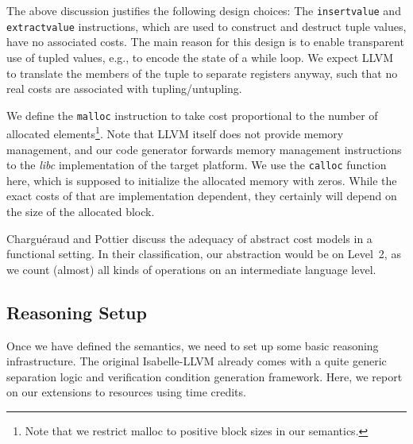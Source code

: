 \documentclass[acmsmall]{acmart}
\newcommand{\is}{\lstinline[language=isabelle]}
\begin{document}

The above discussion justifies the following design choices:
%
The \is{insertvalue} and \is{extractvalue} instructions, which are used to construct and destruct tuple values, have no associated costs.
The main reason for this design is to enable transparent use of tupled values, e.g., to encode the state
of a while loop. We expect LLVM to translate the members of the tuple to separate registers anyway, such that no real costs are associated with tupling/untupling. 
    
We define the \is{malloc} instruction to take cost proportional to the number of allocated elements\footnote{Note that we restrict malloc to positive block sizes in our semantics.}. 
Note that LLVM itself does not provide memory management, and our code generator forwards memory management instructions to
the \emph{libc} implementation of the target platform. We use the \is{calloc} function here, which is supposed to initialize the allocated memory with zeros. While the exact costs of that are implementation dependent, they certainly will depend on the size of the allocated block.

Chargu\'{e}raud and Pottier \cite[\S 2.7]{ChargueraudP19} discuss
the adequacy of abstract cost models in a functional setting. In their classification, our abstraction would be on Level~2, as we count (almost) all kinds of operations on an intermediate language level.


\subsection{Reasoning Setup}
Once we have defined the semantics, we need to set up some basic reasoning infrastructure. The original Isabelle-LLVM already comes with a quite generic separation logic and verification condition generation framework. 
Here, we report on our extensions to resources using time credits.
\end{document}
